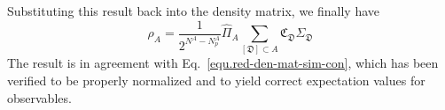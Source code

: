 Substituting this result back into the density matrix, we finally have
\begin{equation}\label{GeneralReducedDensityMatrix_first.e}
  \rho_A = \frac{1}{2^{N^A-N^A_p}}\hat{\Pi}_A \sum_{[\mathfrak{D}]\subset A}\mathfrak{C}_\mathfrak{D} \Sigma_{\mathfrak{D}}
\end{equation}
The result is in agreement with Eq.~\eqref{equ.red-den-mat-sim-con}, which has been verified to be properly normalized and to yield correct expectation values for observables.

